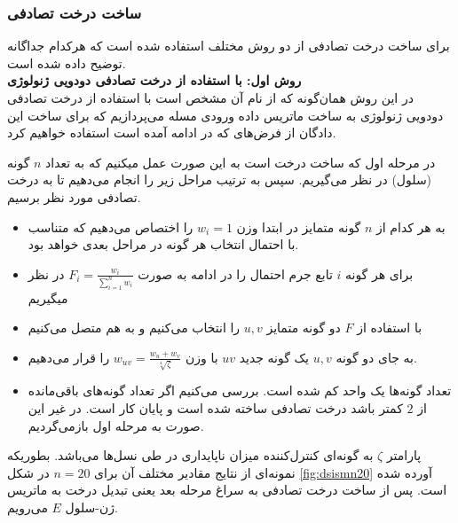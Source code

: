 \subsubsection{ساخت درخت تصادفی}
برای ساخت درخت تصادفی از دو روش مختلف استفاده شده است که هرکدام جداگانه توضیح داده شده است.
\vspace{20pt}
\\
\textbf{روش اول: با استفاده از درخت تصادفی دودویی ژنولوژی}
\\
در این روش همان‌گونه که از نام آن مشخص است با استفاده از درخت تصادفی دودویی ژنولوژی به ساخت ماتریس داده ورودی مسله می‌پردازیم که برای ساخت این دادگان از فرض‌های که در ادامه آمده است استفاده خواهیم کرد. 

در مرحله اول که ساخت درخت است به این صورت عمل میکنیم که به تعداد $n$ گونه (سلول) در نظر می‌گیریم. سپس به ترتیب مراحل زیر را انجام می‌دهیم تا به درخت تصادفی مورد نظر برسیم.
\begin{itemize}
	\item به هر کدام از $n$ گونه متمایز در ابتدا وزن $w_i=1$ را اختصاص می‌دهیم که متناسب با احتمال انتخاب هر گونه در مراحل بعدی خواهد بود.
	\item برای هر گونه ‌$i$ تابع جرم احتمال را در ادامه به صورت $F_i=\frac{w_i}{\sum_{i=1}^{n}w_i}$ در نظر میگیریم
	\item با استفاده از $F$ دو گونه متمایز $u, v$ را انتخاب می‌کنیم و به هم متصل می‌کنیم
	\item به جای دو گونه $u, v$ یک گونه جدید $uv$ با وزن $w_{uv}=\frac{w_u+w_v}{\sqrt[4]{\zeta}}$ را قرار می‌دهیم.
	\item تعداد گونه‌ها یک واحد کم شده است. بررسی می‌کنیم اگر تعداد گونه‌های باقی‌مانده از $2$ کمتر باشد درخت تصادفی ساخته شده است و پایان کار است. در غیر این صورت به مرحله اول بازمی‌گردیم.
\end{itemize}
پارامتر $\zeta$ به گونه‌ای کنترل‌کننده میزان ناپایداری در طی نسل‌ها می‌باشد. بطوریکه نمونه‌ای از نتایج مقادیر مختلف آن برای $n=20$ در شکل \ref{fig:dsismn20} آورده شده است. پس از ساخت درخت تصادفی به سراغ مرحله بعد یعنی تبدیل درخت به ماتریس ژن-سلول $E$ می‌رویم.
